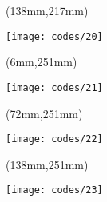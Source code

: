     \begin{textblock*}{66mm}(138mm,217mm)
        \begin{minipage}[t][34mm][t]{\textwidth}
        \vspace*{\fill}
        \texttt{[image: codes/20]}
        \vspace*{\fill}
        \end{minipage}
    \end{textblock*}


    \begin{textblock*}{66mm}(6mm,251mm)
        \begin{minipage}[t][34mm][t]{\textwidth}
        \vspace*{\fill}
        \texttt{[image: codes/21]}
        \vspace*{\fill}
        \end{minipage}
    \end{textblock*}


    \begin{textblock*}{66mm}(72mm,251mm)
        \begin{minipage}[t][34mm][t]{\textwidth}
        \vspace*{\fill}
        \texttt{[image: codes/22]}
        \vspace*{\fill}
        \end{minipage}
    \end{textblock*}


    \begin{textblock*}{66mm}(138mm,251mm)
        \begin{minipage}[t][34mm][t]{\textwidth}
        \vspace*{\fill}
        \texttt{[image: codes/23]}
        \vspace*{\fill}
        \end{minipage}
    \end{textblock*}

